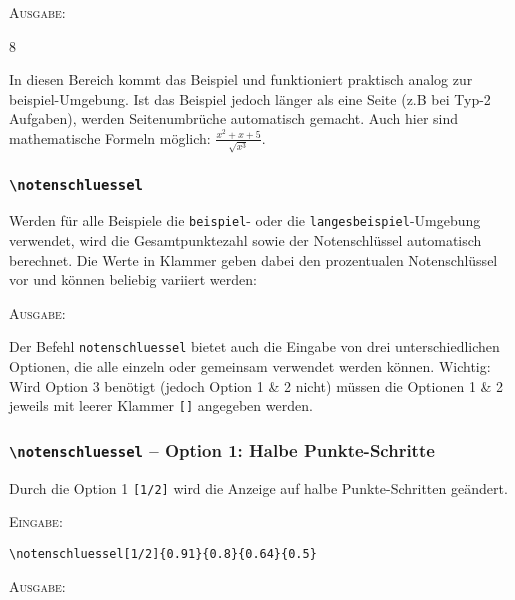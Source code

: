 \documentclass[a4paper,12pt]{article}
\begin{document}
\textsc{Ausgabe:}

\begin{langesbeispiel} \item[8] %

In diesen Bereich kommt das Beispiel und funktioniert praktisch analog zur beispiel-Umgebung. Ist das Beispiel jedoch länger als eine Seite (z.B bei Typ-2 Aufgaben), werden Seitenumbrüche automatisch gemacht. Auch hier sind mathematische Formeln möglich:
$\frac{x^2+x+5}{\sqrt{x^3}}$.		

\end{langesbeispiel}



\subsubsection{\texttt{\textbackslash notenschluessel}}

Werden für alle Beispiele die \texttt{beispiel}- oder die \texttt{langesbeispiel}-Umgebung verwendet, wird die Gesamtpunktezahl sowie der Notenschlüssel automatisch berechnet. Die Werte in Klammer geben dabei den prozentualen Notenschlüssel vor und können beliebig variiert werden:

\vspace{0.4cm}
\setcounter{punkte}{48}
 

\vspace{0.3cm}

\textsc{Ausgabe:}
\vfill
 
Der Befehl \texttt{notenschluessel} bietet auch die Eingabe von drei unterschiedlichen Optionen, die alle einzeln oder gemeinsam verwendet werden können. Wichtig: Wird Option 3 benötigt (jedoch Option 1 \& 2 nicht) müssen die Optionen 1 \& 2 jeweils mit leerer Klammer \texttt{[]} angegeben werden.  

\subsubsection*{\texttt{\textbackslash notenschluessel} -- Option 1: Halbe Punkte-Schritte}

Durch die Option 1 \texttt{[1/2]} wird die Anzeige auf halbe Punkte-Schritten geändert.

\textsc{Eingabe:}
\begin{verbatim}
\notenschluessel[1/2]{0.91}{0.8}{0.64}{0.5}
\end{verbatim}

\textsc{Ausgabe:}
\end{document}
